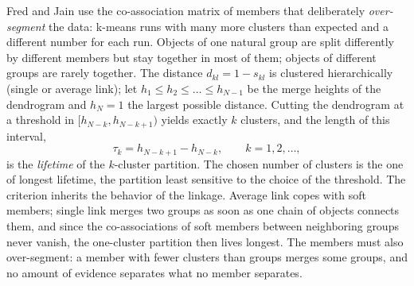 Fred and Jain \cite{fred:2005:eac} use the co-association matrix of members that deliberately \emph{over-segment} the data: k-means runs with many more clusters than expected and a different number for each run. Objects of one natural group are split differently by different members but stay together in most of them; objects of different groups are rarely together. The distance $d_{kl}=1-s_{kl}$ is clustered hierarchically (single or average link); let $h_1\le h_2\le\dots\le h_{N-1}$ be the merge heights of the dendrogram and $h_N=1$ the largest possible distance. Cutting the dendrogram at a threshold in $[h_{N-k},h_{N-k+1})$ yields exactly $k$ clusters, and the length of this interval,
\begin{equation}
  \tau_k=h_{N-k+1}-h_{N-k},\qquad k=1,2,\dots,
  \label{eq:beyond:lifetime}
\end{equation}
is the \emph{lifetime} of the $k$-cluster partition. The chosen number of clusters is the one of longest lifetime, the partition least sensitive to the choice of the threshold. The criterion inherits the behavior of the linkage. Average link copes with soft members; single link merges two groups as soon as one chain of objects connects them, and since the co-associations of soft members between neighboring groups never vanish, the one-cluster partition then lives longest. The members must also over-segment: a member with fewer clusters than groups merges some groups, and no amount of evidence separates what no member separates.

